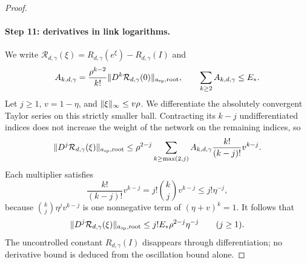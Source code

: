 \begin{proof}
\paragraph{Step 11: derivatives in link logarithms.}
We write $\mathcal R_{d,\gamma}(\xi)=R_{d,\gamma}(e^\xi)-R_{d,\gamma}(I)$ and
\[
 A_{k,d,\gamma}=\frac{\rho^{k-2}}{k!}\lVert D^k\mathcal R_{d,\gamma}(0)\rVert_{a_{\mathrm{sp}},\mathrm{root}},\qquad\sum_{k\ge2}A_{k,d,\gamma}\le E_*.
\]
Let $j\ge1$, $v=1-\eta$, and $\lVert \xi\rVert_\infty\le v\rho$. We differentiate the absolutely convergent Taylor series on this strictly smaller ball. Contracting its $k-j$ undifferentiated indices does not increase the weight of the network on the remaining indices, so
\[
 \lVert D^j\mathcal R_{d,\gamma}(\xi)\rVert_{a_{\mathrm{sp}},\mathrm{root}}
 \le\rho^{2-j}\sum_{k\ge\max(2,j)}A_{k,d,\gamma}\frac{k!}{(k-j)!}v^{k-j}.
\]
Each multiplier satisfies
\[
 \frac{k!}{(k-j)!}v^{k-j}=j!\binom kjv^{k-j}\le j!\eta^{-j},
\]
because $\binom kj\eta^jv^{k-j}$ is one nonnegative term of $(\eta+v)^k=1$. It follows that
\begin{equation}\label{ch11:eq:residual-all-derivatives}
 \lVert D^j\mathcal R_{d,\gamma}(\xi)\rVert_{a_{\mathrm{sp}},\mathrm{root}}\le j!E_*\rho^{2-j}\eta^{-j}\qquad(j\ge1).
\end{equation}
The uncontrolled constant $R_{d,\gamma}(I)$ disappears through differentiation; no derivative bound is deduced from the oscillation bound alone.


\end{proof}
